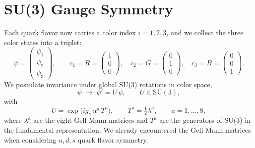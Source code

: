 \documentclass[12pt]{article}
\begin{document}
\section{SU(3) Gauge Symmetry}

Each quark flavor now carries a color index $i = 1,2,3$, and we collect the
three color states into a triplet:
\begin{equation*}
    \psi = \begin{pmatrix} \psi_1 \\ \psi_2 \\ \psi_3 \end{pmatrix},
    \qquad
    c_1 = R = \begin{pmatrix} 1 \\ 0 \\ 0 \end{pmatrix}, \quad
    c_2 = G = \begin{pmatrix} 0 \\ 1 \\ 0 \end{pmatrix}, \quad
    c_3 = B = \begin{pmatrix} 0 \\ 0 \\ 1 \end{pmatrix}.
\end{equation*}
We postulate invariance under global SU(3) rotations in color space,
\begin{equation*}
    \psi \;\longrightarrow\; \psi' = U\,\psi, \qquad U \in \mathrm{SU}(3),
\end{equation*}
with
\begin{equation*}
    U = \exp\!\big( i g_s\, \alpha^a\, T^a \big), \qquad T^a = \tfrac{1}{2}\lambda^a,
    \qquad a = 1,\ldots,8,
\end{equation*}
where $\lambda^a$ are the eight Gell-Mann matrices and $T^a$ are the
generators of SU(3) in the fundamental representation.  We already
encountered the Gell-Mann matrices when considering $u,d,s$ quark
flavor symmetry.\\[5pt]
\end{document}
